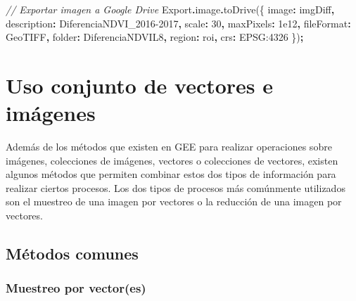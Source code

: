 \documentclass[
  12pt,
  letterpaper,
  twoside]{book}
\newenvironment{Shaded}{\begin{snugshade}}{\end{snugshade}}
\newcommand{\AttributeTok}[1]{\textcolor[rgb]{0.77,0.63,0.00}{#1}}
\newcommand{\CommentTok}[1]{\textcolor[rgb]{0.56,0.35,0.01}{\textit{#1}}}
\newcommand{\DataTypeTok}[1]{\textcolor[rgb]{0.13,0.29,0.53}{#1}}
\newcommand{\DecValTok}[1]{\textcolor[rgb]{0.00,0.00,0.81}{#1}}
\newcommand{\FloatTok}[1]{\textcolor[rgb]{0.00,0.00,0.81}{#1}}
\newcommand{\FunctionTok}[1]{\textcolor[rgb]{0.00,0.00,0.00}{#1}}
\newcommand{\NormalTok}[1]{#1}
\newcommand{\OperatorTok}[1]{\textcolor[rgb]{0.81,0.36,0.00}{\textbf{#1}}}
\newcommand{\StringTok}[1]{\textcolor[rgb]{0.31,0.60,0.02}{#1}}
\begin{document}
\begin{Shaded}
\begin{Highlighting}[]
\CommentTok{// Exportar imagen a Google Drive}
\NormalTok{Export}\OperatorTok{.}\AttributeTok{image}\OperatorTok{.}\FunctionTok{toDrive}\NormalTok{(\{}
  \DataTypeTok{image}\OperatorTok{:}\NormalTok{ imgDiff}\OperatorTok{,}
  \DataTypeTok{description}\OperatorTok{:} \StringTok{\textquotesingle{}DiferenciaNDVI\_2016{-}2017\textquotesingle{}}\OperatorTok{,}
  \DataTypeTok{scale}\OperatorTok{:} \DecValTok{30}\OperatorTok{,}
  \DataTypeTok{maxPixels}\OperatorTok{:} \FloatTok{1e12}\OperatorTok{,}
  \DataTypeTok{fileFormat}\OperatorTok{:} \StringTok{\textquotesingle{}GeoTIFF\textquotesingle{}}\OperatorTok{,}
  \DataTypeTok{folder}\OperatorTok{:} \StringTok{\textquotesingle{}DiferenciaNDVIL8\textquotesingle{}}\OperatorTok{,}
  \DataTypeTok{region}\OperatorTok{:}\NormalTok{ roi}\OperatorTok{,}
  \DataTypeTok{crs}\OperatorTok{:} \StringTok{\textquotesingle{}EPSG:4326}
\NormalTok{\})}\OperatorTok{;} 
\end{Highlighting}
\end{Shaded}

\newpage

\hypertarget{uso-conjunto-de-vectores-e-imuxe1genes}{%
\chapter{Uso conjunto de vectores e imágenes}\label{uso-conjunto-de-vectores-e-imuxe1genes}}

Además de los métodos que existen en GEE para realizar operaciones sobre imágenes, colecciones de imágenes, vectores o colecciones de vectores, existen algunos métodos que permiten combinar estos dos tipos de información para realizar ciertos procesos. Los dos tipos de procesos más comúnmente utilizados son el muestreo de una imagen por vectores o la reducción de una imagen por vectores.

\hypertarget{muxe9todos-comunes-5}{%
\section{Métodos comunes}\label{muxe9todos-comunes-5}}

\hypertarget{muestreo-por-vectores}{%
\subsection*{Muestreo por vector(es)}\label{muestreo-por-vectores}}
\end{document}
